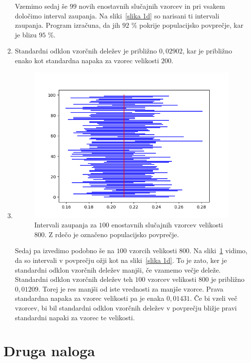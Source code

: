 \documentclass{article}
\begin{document}
\begin{enumerate}[label=\alph*)]
        Vzemimo sedaj še $99$ novih enostavnih slučajnih vzorcev in pri vsakem
        določimo interval zaupanja. Na sliki~\ref{slika 1d} so narisani ti
        intervali zaupanja. Program izračuna, da jih $92$ \% pokrije
        populacijsko povprečje, kar je blizu $95$ \%.
    \item Standardni odklon vzorčnih deležev je približno $0{,}02902$, kar je
        približno enako kot standardna napaka za vzorec velikosti $200$.
    \item
        \begin{figure}[H]
            \centering
            \includegraphics[scale=0.5]{1f.png}
            \caption{Intervali zaupanja za $100$ enostavnih slučajnih vzorcev
            velikosti $800$. Z rdečo je označeno populacijsko povprečje.}
            \label{slika 1f}
        \end{figure}
        Sedaj pa izvedimo podobno še na $100$ vzorcih velikosti $800$. Na
        sliki~\ref{slika 1f} vidimo, da so intervali v povprečju ožji kot na
        sliki~\ref{slika 1d}. To je zato, ker je standardni odklon vzorčnih
        deležev manjši, če vzamemo večje deleže. Standardni odklon vzorčnih
        deležev teh $100$ vzorcev velikosti $800$ je približno $0{,}01209$.
        Torej je res manjši od iste vrednosti za manjše vzorce. Prava standardna
        napaka za vzorec velikosti pa je enaka $0{,}01431$. Če bi vzeli več
        vzorcev, bi bil standardni odklon vzorčnih deležev v povprečju bližje
        pravi standardni napaki za vzorec te velikosti.
\end{enumerate}

\section{Druga naloga}
\end{document}
